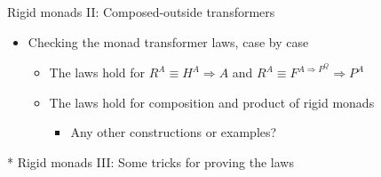 \documentclass[english]{beamer}
\begin{document}
\begin{frame}{Rigid monads II: Composed-outside transformers}
\begin{itemize}
\begin{itemize}
\end{itemize}
\item Checking the monad transformer laws, case by case
\begin{itemize}
\item The laws hold for $R^{A}\equiv H^{A}\Rightarrow A$ and $R^{A}\equiv F^{A\Rightarrow P^{Q}}\Rightarrow P^{A}$
\item The laws hold for composition and product of rigid monads
\begin{itemize}
\item Any other constructions or examples?
\end{itemize}
\end{itemize}
\end{itemize}
\end{frame}

\begin{frame}{{*} Rigid monads III: Some tricks for proving the laws}


\end{frame}
\end{document}
